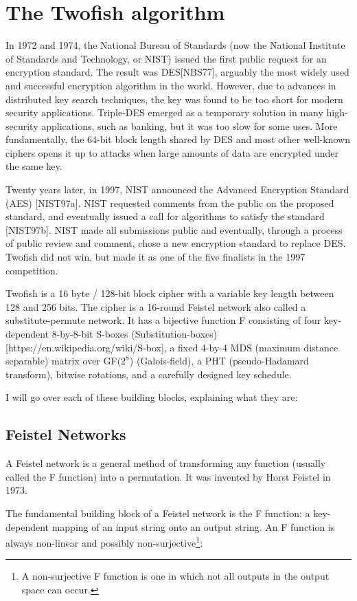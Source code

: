 \section{The Twofish algorithm}
In 1972 and 1974, the National Bureau of Standards (now the National Institute of Standards and Technology, or NIST) issued the first public request for an encryption standard. The result was DES[NBS77], arguably the most widely used and successful encryption algorithm in the world. However, due to advances in distributed key search techniques, the key was found to be too short for modern security applications.
Triple-DES emerged as a temporary solution in many high-security applications, such as banking, but it was too slow for some uses. More fundamentally, the 64-bit block length shared by DES and most other well-known ciphers opens it up to attacks when large amounts of data are encrypted under the same key.

Twenty years later, in 1997, NIST announced the Advanced Encryption Standard (AES) [NIST97a]. NIST requested comments from the public on the proposed standard, and eventually issued a call for algorithms to satisfy the standard [NIST97b]. NIST made all submissions public and eventually, through a process of public review and comment, chose a new encryption standard to replace DES. Twofish did not win, but made it as one of the five finalists in the 1997 competition.

Twofish is a 16 byte / 128-bit block cipher with a variable key length between 128 and 256 bits. The cipher is a 16-round Feistel network also called a substitute-permute network. It has a bijective function F consisting of four key-dependent 8-by-8-bit S-boxes (Substitution-boxes)[https://en.wikipedia.org/wiki/S-box], a fixed 4-by-4 MDS (maximum distance separable) matrix over GF($2^8$) (Galois-field), a PHT (pseudo-Hadamard transform), bitwise rotations, and a carefully designed key schedule.

I will go over each of these building blocks, explaining what they are:

\subsection{Feistel Networks}
A Feistel network is a general method of transforming any function (usually called the F function) into a permutation. It was invented by Horst Feistel in 1973.

The fundamental building block of a Feistel network is the F function: a key-dependent mapping of an input string onto an output string. An F function is always non-linear and possibly non-surjective\footnote{A non-surjective F function is one in which not all outputs in the output space can occur.}:

